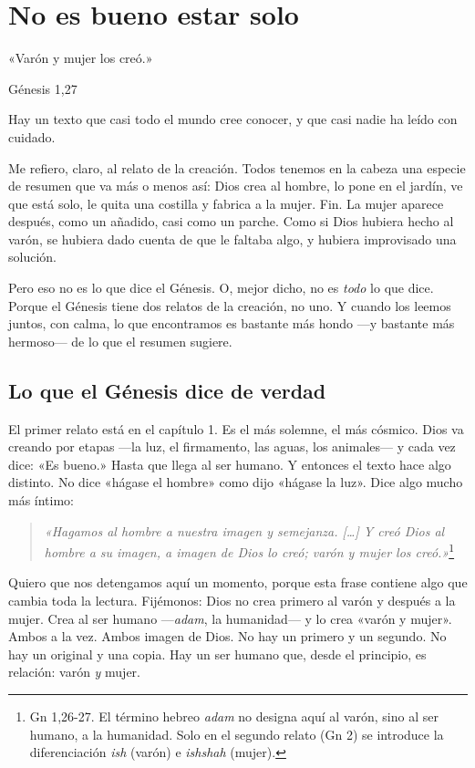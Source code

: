 \chapter{No es bueno estar solo}

\epigraph{«Varón y mujer los creó.»}{Génesis 1,27}

Hay un texto que casi todo el mundo cree conocer, y que casi nadie ha leído con cuidado.

Me refiero, claro, al relato de la creación. Todos tenemos en la cabeza una especie de resumen que va más o menos así: Dios crea al hombre, lo pone en el jardín, ve que está solo, le quita una costilla y fabrica a la mujer. Fin. La mujer aparece después, como un añadido, casi como un parche. Como si Dios hubiera hecho al varón, se hubiera dado cuenta de que le faltaba algo, y hubiera improvisado una solución.

Pero eso no es lo que dice el Génesis. O, mejor dicho, no es \emph{todo} lo que dice. Porque el Génesis tiene dos relatos de la creación, no uno. Y cuando los leemos juntos, con calma, lo que encontramos es bastante más hondo ---y bastante más hermoso--- de lo que el resumen sugiere.

\section{Lo que el Génesis dice de verdad}

El primer relato está en el capítulo 1. Es el más solemne, el más cósmico. Dios va creando por etapas ---la luz, el firmamento, las aguas, los animales--- y cada vez dice: «Es bueno.» Hasta que llega al ser humano. Y entonces el texto hace algo distinto. No dice «hágase el hombre» como dijo «hágase la luz». Dice algo mucho más íntimo:

\begin{quotation}
\textit{«Hagamos al hombre a nuestra imagen y semejanza. [\ldots] Y creó Dios al hombre a su imagen, a imagen de Dios lo creó; varón y mujer los creó.»}\footnote{Gn 1,26-27. El término hebreo \textit{adam} no designa aquí al varón, sino al ser humano, a la humanidad. Solo en el segundo relato (Gn 2) se introduce la diferenciación \textit{ish} (varón) e \textit{ishshah} (mujer).}
\end{quotation}

Quiero que nos detengamos aquí un momento, porque esta frase contiene algo que cambia toda la lectura. Fijémonos: Dios no crea primero al varón y después a la mujer. Crea al ser humano ---\textit{adam}, la humanidad--- y lo crea «varón y mujer». Ambos a la vez. Ambos imagen de Dios. No hay un primero y un segundo. No hay un original y una copia. Hay un ser humano que, desde el principio, es relación: varón \emph{y} mujer.

